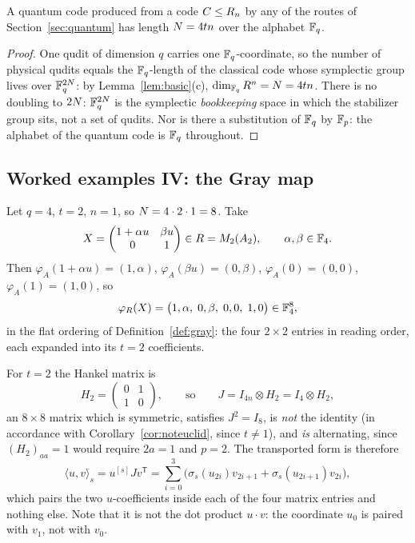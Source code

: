 \begin{theorem}\label{thm:nphys}
A quantum code produced from a code $C\le R_n$ by any of the routes of
Section~\ref{sec:quantum} has length $N=4tn$ over the alphabet $\mathbb F_q$.
\end{theorem}

\begin{proof}
One qudit of dimension $q$ carries one $\mathbb F_q$-coordinate, so the number of
physical qudits equals the $\mathbb F_q$-length of the classical code whose symplectic
group lives over $\mathbb F_q^{2N}$: by Lemma~\ref{lem:basic}(c),
$\dim_{\mathbb F_q}R^n=N=4tn$. There is no doubling to $2N$: $\mathbb F_q^{2N}$
is the symplectic \emph{bookkeeping} space in which the stabilizer group sits,
not a set of qudits. Nor is there a substitution of $\mathbb F_q$ by $\mathbb F_p$: the
alphabet of the quantum code is $\mathbb F_q$ throughout.
\end{proof}

\subsection{Worked examples IV: the Gray map}

\begin{example}[the coefficient expansion and the Gram matrix, at $t=2$]
\label{ex:gray}
Let $q=4$, $t=2$, $n=1$, so $N=4\cdot2\cdot1=8$. Take
\[
  X=\begin{pmatrix}1+\alpha u&\beta u\\ 0&1\end{pmatrix}\in R=M_2(A_2),
  \qquad \alpha,\beta\in\mathbb F_4 .
\]
Then $\varphi_A(1+\alpha u)=(1,\alpha)$, $\varphi_A(\beta u)=(0,\beta)$,
$\varphi_A(0)=(0,0)$, $\varphi_A(1)=(1,0)$, so
\[
  \varphi_R(X)=\bigl(1,\alpha,\;0,\beta,\;0,0,\;1,0\bigr)\in\mathbb F_4^8 ,
\]
in the flat ordering of Definition~\ref{def:gray}: the four $2\times2$ entries
in reading order, each expanded into its $t=2$ coefficients.

For $t=2$ the Hankel matrix is
\[
  H_2=\begin{pmatrix}0&1\\1&0\end{pmatrix},
  \qquad\text{so}\qquad
  J=I_{4n}\otimes H_2=I_4\otimes H_2 ,
\]
an $8\times8$ matrix which is symmetric, satisfies $J^2=I_8$, is \emph{not}
the identity (in accordance with Corollary~\ref{cor:noteuclid}, since
$t\ne1$), and \emph{is} alternating, since $(H_2)_{aa}=1$ would require
$2a=1$ and $p=2$. The transported form is therefore
\[
  \langle u,v\rangle^{\widehat{}}_s=u^{[s]}Jv^{\mathsf T}
  =\sum_{i=0}^{3}\bigl(\sigma_s(u_{2i})v_{2i+1}
    +\sigma_s(u_{2i+1})v_{2i}\bigr),
\]
which pairs the two $u$-coefficients inside each of the four matrix entries
and nothing else. Note that it is not the dot product $u\cdot v$: the
coordinate $u_0$ is paired with $v_1$, not with $v_0$.
\end{example}

